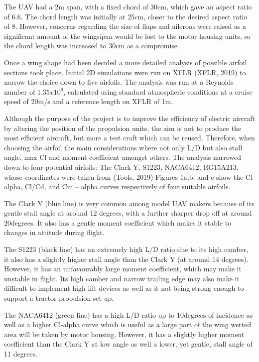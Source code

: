 \documentclass[../../main.tex]{subfiles}
\begin{document}
The UAV had a 2m span, with a fixed chord of 30cm, which gave an aspect ratio of 6.6.
The chord length was initially at 25cm, closer to the desired aspect ratio of 8.
However, concerns regarding the size of flaps and ailerons were raised as a significant amount of the wingsipan would be lost to the motor housing units, so the chord length was increased to 30cm as a compromise.  

Once a wing shape had been decided a more detailed analysis of possible airfoil sections took place.
Initial 2D simulations were run on XFLR (XFLR, 2019) to narrow the choice down to five airfoils.
The analysis was run at a Reynolds number of $1.35x10^6$, calculated using standard atmospheric conditions at a cruise speed of 20m/s and a reference length on XFLR of 1m. 

Although the purpose of the project is to improve the efficiency of electric aircraft by altering the position of the propulsion units, the aim is not to produce the most efficient aircraft, but more a test craft which can be reused.
Therefore, when choosing the airfoil the main considerations where not only L/D but also stall angle, max Cl and moment coefficient amongst others.
The analysis narrowed down to four potential airfoils: The Clark Y, S1223, NACA6412, RG15A213, whose coordinates were taken from (Tools, 2019) Figures 1a,b, and c  show the Cl-alpha, Cl/Cd, and Cm – alpha curves respectively of four suitable airfoils. 

The Clark Y (blue line) is very common among model UAV makers because of its gentle stall angle at around 12 degrees, with a further sharper drop off at around 20degrees.
It also has a gentle moment coefficient which makes it stable to changes in attitude during flight. 

The S1223 (black line) has an extremely high L/D ratio due to its high camber, it also has a slightly higher stall angle than the Clark Y (at around 14 degrees).
However, it has an unfavourably large moment coefficient, which may make it unstable in flight.
Its high camber and narrow trailing edge may also make it difficult to implement high lift devices as well as it not being strong enough to support a tractor propulsion set up. 

The NACA6412  (green line) has a high L/D ratio up to 10degrees of incidence as well as a higher Cl-alpha curve which is useful as a large part of the wing wetted area will be taken by motor housing.
However, it has a slightly higher moment coefficient than the Clark Y at low angle as well a lower, yet gentle, stall angle of 11 degrees.
\end{document}
